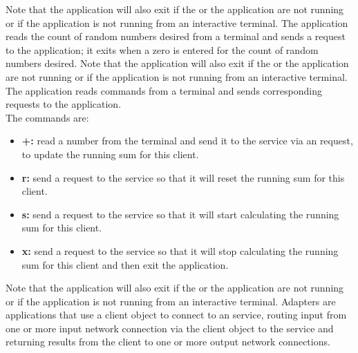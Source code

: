 Note that the application will also exit if the
 or the
 application are not running or if the application
is not running from an interactive terminal.
The  application reads the count of
random numbers desired from a terminal and sends a
 request to the
 application; it exits when a zero is
entered for the count of random numbers desired.
Note that the application will also exit if the
 or the
 application are not running or if the
application is not running from an interactive terminal.
The  application reads commands from a
terminal and sends corresponding requests to the
 application.\\

The commands are:
\begin{itemize}
\item \textbf{+:} read a number from the terminal and send it to the service via an
 request, to update the running sum for this
client.
\item \textbf{r:} send a  request to the
service so that it will reset the running sum for this client.
\item \textbf{s:} send a  request to the
service so that it will start calculating the running sum for this client.
\item \textbf{x:} send a  request to the
service so that it will stop calculating the running sum for this client and then exit the
application.
\end{itemize}
Note that the application will also exit if the
 or the
 application are not running or if the
application is not running from an interactive terminal.
\secondaryEnd{}
Adapters are applications that use a client object to connect to an \mplusm{} service,
routing input from one or more input \yarp{} network connection via the client object to
the service and returning results from the client to one or more output \yarp{} network
connections.\\

